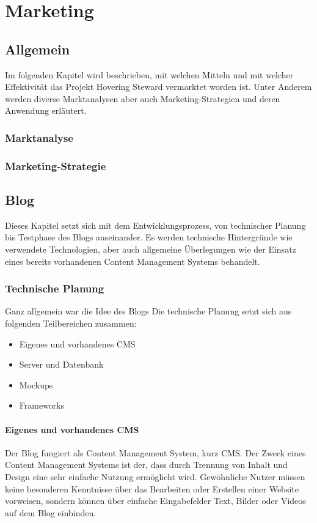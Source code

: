 \chapter{Marketing}
\renewcommand{\kapitelautor}{Autor: Markus Kaiser}

\section{Allgemein}
Im folgenden Kapitel wird beschrieben, mit welchen Mitteln und mit welcher Effektivität
das Projekt Hovering Steward vermarktet worden ist. Unter Anderem werden diverse Marktanalysen
aber auch Marketing-Strategien und deren Anwendung erläutert.
  \subsection{Marktanalyse}

  \subsection{Marketing-Strategie}

\section{Blog}
Dieses Kapitel setzt sich mit dem Entwicklungsprozess, von technischer Planung bis Testphase
des Blogs auseinander. Es werden technische Hintergründe wie verwendete Technologien, aber
auch allgemeine Überlegungen wie der Einsatz eines bereits vorhandenen Content Management Systems
behandelt.
  \subsection{Technische Planung}
  Ganz allgemein war die Idee des Blogs
  Die technische Planung setzt sich aus folgenden Teilbereichen zusammen:
    \begin{itemize}
      \item Eigenes und vorhandenes CMS
      \item Server und Datenbank
      \item Mockups
      \item Frameworks
    \end{itemize}
    \subsubsection{Eigenes und vorhandenes CMS}
    Der Blog fungiert als Content Management System, kurz CMS. Der Zweck eines
    Content Management Systems ist der, dass durch Trennung von Inhalt und Design eine
    sehr einfache Nutzung ermöglicht wird. Gewöhnliche Nutzer müssen keine besonderen
    Kenntnisse über das Bearbeiten oder Erstellen einer Website vorweisen, sondern
    können über einfache Eingabefelder Text, Bilder oder Videos auf dem Blog einbinden.

